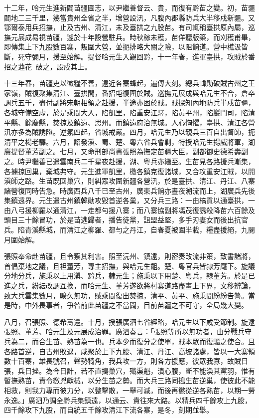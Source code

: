 \begin{pinyinscope}
十二年，哈元生進新闢苗疆圖志，以尹繼善督云、貴，而復有黔苗之變。初，苗疆闢地二三千里，幾當貴州全省之半，增營設汛，凡腹內郡縣防兵大半移戍新疆。又鄂爾泰用兵招撫，止及古州、清江，未及臺拱之九股苗。有司輒稱臺拱原內屬，巡撫元展成易視苗疆，遽於十年設營駐兵。時秋稼未穫，苗佯聽版築，而刈穫甫畢，即傳集上下九股數百寨，叛圍大營，並扼排略大關之險，以阻餉道。營中樵汲皆斷，死守彌月，援至始解。提督哈元生入覲回黔，十一年春，進軍臺拱，攻賊於番招之蓮花，破之，設戍其上。

十三年春，苗疆吏以徵糧不善，遠近各寨蜂起，遍傳大刻。總兵韓勛破賊古州之王家嶺，賊復聚集清江、臺拱間，番招屯復圍於賊。巡撫元展成與哈元生不合，倉卒調兵五千，盡付副將宋朝相領之赴援，半途亦困於賊。賊探知內地防兵半戍苗疆，各城守備空虛，於是乘間大入，陷凱里，陷重安江驛，陷黃平州，陷巖門司，陷清平縣、餘慶縣，焚掠及鎮遠、思州。而鎮遠府治無城。人心恟懼，臺拱、清江各營汛亦多為賊誘陷。逆氛四起，省城戒嚴。四月，哈元生乃以親兵三百自出督師，扼清平之楊老驛。六月，詔發滇、蜀、楚、粵六省兵會剿，特授哈元生揚威將軍，湖廣提督董芳副之。七月，又命刑部尚書張照為撫定苗疆大臣，副都御史德希壽副之。時尹繼善已遣雲南兵二千星夜赴援，湖、粵兵亦繼至。生苗見各路援兵漸集，各擄掠回巢，棄城弗守。元生進軍凱里，檄各鎮克復諸城，又合攻重安江賊，以開滇師之路。生苗既回巢穴，則糾眾攻圍新疆各營汛，於是臺拱、清江、丹江、八寨諸營復同時告急。時廣西兵八千已至古州，廣東兵餉亦晝夜溯流而上，湖廣兵先後集鎮遠界。元生遣古州鎮韓勛攻毀首逆各巢，又分兵三路：一由槁貢以通臺拱，一由八弓援柳羅以通清江，一走都勻援八寨；而八寨協副將馮茂復誘殺降苗六百餘及頭目三十餘冒功，於是苗逃歸者，播告徒黨，詛盟益堅，多手刃妻女而後出抗官兵。陷青溪縣城，而清江之柳羅、都勻之丹江，自春夏被圍半載，糧盡援絕，九閱月圍始解。

張照奉命赴苗疆，且令察其利害。照至沅州、鎮遠，則密奏改流非策，致書諸將，首倡棄地之議，且袒董芳，專主招撫，與哈元生齟。楚、粵官兵皆隸芳麾下。旋議分地分兵，施秉以上用滇、黔兵，隸元生；施秉以下用楚、粵兵，隸董芳。於是已進之兵，紛紜改調互換，而哈元生、董芳遂欲將村寨道路盡畫上下界，文移辨論，致大兵雲集數月，曠久無功，賊乘間復出焚掠，清平、黃平、施秉間紛紛告警。當是時，中外畏事者，爭咎前此苗疆之不當闢，目前苗疆之不可守，全局幾大變。

八月，召張照、德希壽還。十月，授張廣泗七省經略，哈元生以下咸受節制。旋逮張照、董芳、哈元生及元展成治罪。廣泗奏言：「張照等所以無功者，由分戰兵守兵為二，而合生苗、熟苗為一也。兵本少而復分之使單，賊本眾而復驅之使合。且各路首逆，自古州敗退，咸聚於上下九股、清江、丹江、高坡諸處，皆以一大寨領數十百寨，雄長號召，聲勢犄角，我兵攻一方，則各方援應，彼眾我寡，故賊日張，兵日挫。為今日計，若不直搗巢穴，殲渠魁，潰心腹，斷不能渙其黨羽，惟有暫撫熟苗，責令繳兇獻械，以分生苗之勢。而大兵三路同搗生苗逆巢，使彼此不能相救，則我力專而彼力分，以整擊散，一舉可滅，而後再懲從逆各熟苗，以期一勞永逸。」廣泗乃調全黔兵集鎮遠，以通云、貴往來大路。以精兵四千餘攻上九股，四千餘攻下九股，而自統五千餘攻清江下流各寨，是冬，刻期並舉。


\end{pinyinscope}
